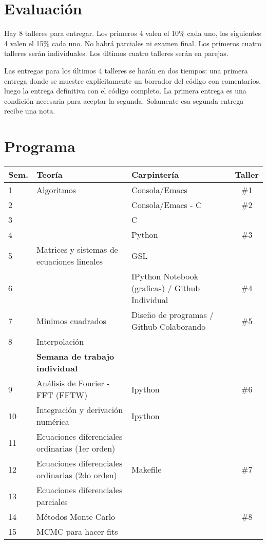 \documentclass[12pt]{article}
\begin{document}
\section*{Evaluaci\'on}

Hay 8 talleres para entregar. Los primeros 4 valen el 10\% cada uno, los siguientes 4 valen el 15\% cada uno. No habr\'a parciales ni examen final. Los primeros cuatro talleres ser\'an individuales. Los \'ultimos cuatro talleres ser\'an en parejas. 

Las entregas para los \'ultimos 4 talleres se har\'an en dos tiempos: una primera entrega donde se muestre expl\'icitamente un borrador del c\'odigo con comentarios, luego la entrega definitiva con el c\'odigo completo. La primera entrega es una condici\'on necesaria para aceptar la segunda. Solamente esa segunda entrega recibe una nota.

 \newpage
\section*{Programa}

\begin{center}
\begin{tabular}{|p{1cm}|p{6cm}|p{5cm}|c|}
\hline
Sem. & Teor\'ia & Carpinter\'ia & Taller \\\hline
1 & Algoritmos	&Consola/Emacs & \#1\\
2 & 	& Consola/Emacs - C  & \#2\\
3 & 	&C  &    \\
4 & 	&Python & \#3\\
5 & Matrices y sistemas de ecuaciones lineales  & GSL &\\
6 & 	&IPython Notebook (graficas) / Github Individual & \#4 \\
7 & M\'inimos cuadrados & Dise\~no de programas / Github Colaborando & \#5\\
8 & Interpolaci\'on & & \\
 & {\bf Semana de trabajo individual} & &\\
9 & An\'alisis de Fourier - FFT  (FFTW)&  Ipython & \#6 \\
10 & Integraci\'on y derivaci\'on num\'erica & Ipython &\\
11 & Ecuaciones diferenciales ordinarias (1er orden)&  &\\
12 & Ecuaciones diferenciales ordinarias (2do orden)&  Makefile & \#7 \\
13 & Ecuaciones diferenciales parciales &  & \\
14 & M\'etodos Monte Carlo &   & \#8 \\
15 & MCMC para hacer fits &    & \\

\hline
\end{tabular}
\end{center}
\end{document}
